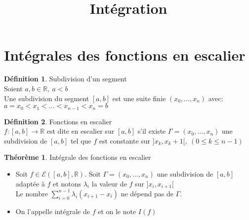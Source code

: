 \documentclass[fleqn]{article}
\title{Int\'egration}
\date{}
\theoremstyle{definition} \newtheorem*{defi}{D\'efinition}
\theoremstyle{definition} \newtheorem*{theo}{Th\'eor\`eme}
\theoremstyle{definition} \newtheorem*{coro}{Corollaire}
\theoremstyle{remark} \newtheorem*{rqs}{Remarques}
\theoremstyle{definition} \newtheorem*{prop}{Propri\'et\'e}
\begin{document}
\maketitle

\section{Int\'egrales des fonctions en escalier}
\begin{defi} Subdivision d'un segment\\
	Soient $a, b\in \mathbb{R},\ a<b$\\
	Une subdivision du segment $[a,b]$ est une suite finie $(x_0, \hdots, x_n)$ avec: \\ $a=x_0 < x_1 < \hdots < x_{n-1} <  x_n = b$
\end{defi}

\begin{defi} Fonctions en escalier\\
	$f: [a,b] \rightarrow \mathbb{R}$ est dite en escalier sur $[a,b]$ s'il existe $\Gamma = (x_0, \hdots, x_n)$ une subdivision de $[a,b]$
	tel que $f$ est constante sur $]x_k, x_k+1[,\ (0 \leq k \leq n-1)$
\end{defi}

\begin{theo} Int\'egrale des fonctions en escalier
	\begin{itemize}
	\item Soit $f \in \mathcal{E}([a,b], \mathbb{R})$. Soit $\Gamma = (x_0, \hdots, x_n)$ une subdivision de $[a,b]$ adapt\'ee \`a $f$ et
		notons $\lambda_i$ la valeur de $f$ sur $]x_i, x_{i+1}[$ \\
		Le nombre $\sum_{i = 0}^{n-1} \lambda_i (x_{i+1} - x_i)$ ne d\'epend pas de $\Gamma$.
	\item On l'appelle int\'egrale de $f$ et on le note $I(f)$
	\end{itemize}
\end{theo}
\end{document}
